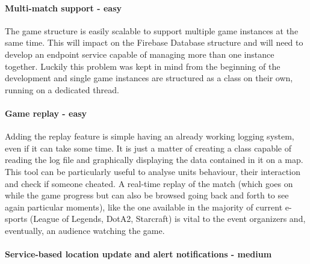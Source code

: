 	\paragraph{Multi-match support - easy}
	
	The game structure is easily scalable to support multiple game instances at the same time. This will impact on the Firebase Database structure and will need to develop an endpoint service capable of managing more than one instance together. Luckily this problem was kept in mind from the beginning of the development and single game instances are structured as a class on their own, running on a dedicated thread.
	
	\paragraph{Game replay - easy}
	
	Adding the replay feature is simple having an already working logging system, even if it can take some time. It is just a matter of creating a class capable of reading the log file and graphically displaying the data contained in it on a map. This tool can be particularly useful to analyse units behaviour, their interaction and check if someone cheated. A real-time replay of the match (which goes on while the game progress but can also be browsed going back and forth to see again particular moments), like the one available in the majority of current e-sports (League of Legends, DotA2, Starcraft) is vital to the event organizers and, eventually, an audience watching the game.
	
	\paragraph{Service-based location update and alert notifications - medium}
	

